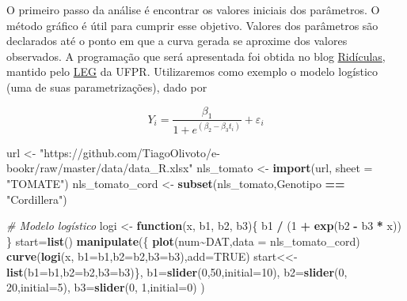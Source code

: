 \documentclass[
]{book}
\newenvironment{Shaded}{\begin{snugshade}}{\end{snugshade}}
\newcommand{\CommentTok}[1]{\textcolor[rgb]{0.56,0.35,0.01}{\textit{#1}}}
\newcommand{\ControlFlowTok}[1]{\textcolor[rgb]{0.13,0.29,0.53}{\textbf{#1}}}
\newcommand{\DataTypeTok}[1]{\textcolor[rgb]{0.13,0.29,0.53}{#1}}
\newcommand{\DecValTok}[1]{\textcolor[rgb]{0.00,0.00,0.81}{#1}}
\newcommand{\KeywordTok}[1]{\textcolor[rgb]{0.13,0.29,0.53}{\textbf{#1}}}
\newcommand{\NormalTok}[1]{#1}
\newcommand{\OperatorTok}[1]{\textcolor[rgb]{0.81,0.36,0.00}{\textbf{#1}}}
\newcommand{\OtherTok}[1]{\textcolor[rgb]{0.56,0.35,0.01}{#1}}
\newcommand{\StringTok}[1]{\textcolor[rgb]{0.31,0.60,0.02}{#1}}
\numberwithin{equation}{section}
\newcommand{\indt}[1]{\index{#1|ST}}
\begin{document}
O primeiro passo da análise é encontrar os valores iniciais dos parâmetros. O método gráfico é útil para cumprir esse objetivo. Valores dos parâmetros \indt{parâmetros}são declarados até o ponto em que a curva gerada se aproxime dos valores observados. A programação que será apresentada foi obtida no blog \href{https://ridiculas.wordpress.com/tag/nao-linear/}{Ridículas}, mantido pelo \href{http://www.leg.ufpr.br/doku.php/start}{LEG} da UFPR. Utilizaremos como exemplo o modelo logístico (uma de suas parametrizações), dado por

\[
{Y_i} = \frac{{{\beta _1}}}{{1 + {e^{\left( {{\beta _2} - {\beta _3}{t_i}} \right)}}}} + {\varepsilon _i}
\]

\begin{Shaded}
\begin{Highlighting}[]
\NormalTok{url \textless{}{-}}\StringTok{ "https://github.com/TiagoOlivoto/e{-}bookr/raw/master/data/data\_R.xlsx"}
\NormalTok{nls\_tomato \textless{}{-}}\StringTok{ }\KeywordTok{import}\NormalTok{(url, }\DataTypeTok{sheet =} \StringTok{"TOMATE"}\NormalTok{)}
\NormalTok{nls\_tomato\_cord \textless{}{-}}\StringTok{ }\KeywordTok{subset}\NormalTok{(nls\_tomato,Genotipo  }\OperatorTok{==}\StringTok{  "Cordillera"}\NormalTok{) }
\end{Highlighting}
\end{Shaded}

\begin{Shaded}
\begin{Highlighting}[]
\CommentTok{\# Modelo logístico}
\NormalTok{logi \textless{}{-}}\StringTok{ }\ControlFlowTok{function}\NormalTok{(x, b1, b2, b3)\{}
\NormalTok{  b1 }\OperatorTok{/}\StringTok{ }\NormalTok{(}\DecValTok{1} \OperatorTok{+}\StringTok{ }\KeywordTok{exp}\NormalTok{(b2 }\OperatorTok{{-}}\StringTok{ }\NormalTok{b3 }\OperatorTok{*}\StringTok{ }\NormalTok{x))}
\NormalTok{\}}
\NormalTok{start=}\KeywordTok{list}\NormalTok{()}
\KeywordTok{manipulate}\NormalTok{(\{}
  \KeywordTok{plot}\NormalTok{(num}\OperatorTok{\textasciitilde{}}\NormalTok{DAT,}\DataTypeTok{data =}\NormalTok{ nls\_tomato\_cord)}
  \KeywordTok{curve}\NormalTok{(}\KeywordTok{logi}\NormalTok{(x, }\DataTypeTok{b1=}\NormalTok{b1,}\DataTypeTok{b2=}\NormalTok{b2,}\DataTypeTok{b3=}\NormalTok{b3),}\DataTypeTok{add=}\OtherTok{TRUE}\NormalTok{)}
\NormalTok{  start\textless{}\textless{}{-}}\KeywordTok{list}\NormalTok{(}\DataTypeTok{b1=}\NormalTok{b1,}\DataTypeTok{b2=}\NormalTok{b2,}\DataTypeTok{b3=}\NormalTok{b3)\},}
  \DataTypeTok{b1=}\KeywordTok{slider}\NormalTok{(}\DecValTok{0}\NormalTok{,}\DecValTok{50}\NormalTok{,}\DataTypeTok{initial=}\DecValTok{10}\NormalTok{),}
  \DataTypeTok{b2=}\KeywordTok{slider}\NormalTok{(}\DecValTok{0}\NormalTok{, }\DecValTok{20}\NormalTok{,}\DataTypeTok{initial=}\DecValTok{5}\NormalTok{),}
  \DataTypeTok{b3=}\KeywordTok{slider}\NormalTok{(}\DecValTok{0}\NormalTok{, }\DecValTok{1}\NormalTok{,}\DataTypeTok{initial=}\DecValTok{0}\NormalTok{)}
\NormalTok{)}
\end{Highlighting}
\end{Shaded}
\end{document}
